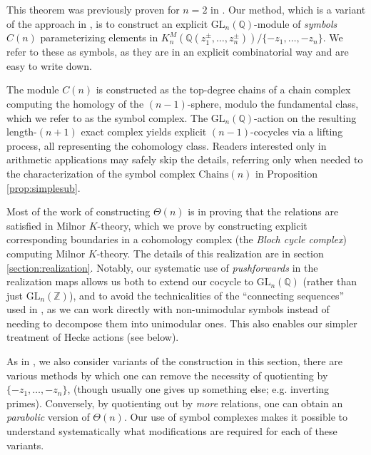 \documentclass[10pt]{amsart}
\theoremstyle{definition}
\newcommand{\Z}{\mathbb{Z}}
\newcommand{\Q}{\mathbb{Q}}
\newcommand{\Chains}{\mathrm{Chains}}
\newcommand{\GL}{\mathrm{GL}}
\numberwithin{equation}{section}
\begin{document}
    This theorem was previously proven for $n=2$ in \cite{SV}. Our method, which is a variant of the approach in \cite[\S5]{SV}, is to construct an explicit $\GL_n(\Q)$-module of \emph{symbols} $C(n)$ parameterizing elements in $K_n^M(\Q(z_1^{\pm},\ldots, z_n^{\pm}))/\{-z_1,\ldots, -z_n\}$. We refer to these as symbols, as they are in an explicit combinatorial way and are easy to write down.

    The module $C(n)$ is constructed as the top-degree chains of a chain complex computing the homology of the $(n-1)$-sphere, modulo the fundamental class, which we refer to as the symbol complex. The $\GL_n(\Q)$-action on the resulting length-$(n+1)$ exact complex yields explicit $(n-1)$-cocycles via a lifting process, all representing the cohomology class. Readers interested only in arithmetic applications may safely skip the details, referring only when needed to the characterization of the symbol complex $\Chains(n)$ in Proposition \ref{prop:simplesub}. 
    
    Most of the work of constructing $\Theta(n)$ is in proving that the relations are satisfied in Milnor $K$-theory, which we prove by constructing explicit corresponding boundaries in a cohomology complex (the \emph{Bloch cycle complex}) computing Milnor $K$-theory. The details of this realization are in section \ref{section:realization}. Notably, our systematic use of \emph{pushforwards} in the realization maps allows us both to extend our cocycle to $\GL_n(\Q)$ (rather than just $\GL_n(\Z)$), and to avoid the technicalities of the ``connecting sequences'' used in \cite{SV}, as we can work directly with non-unimodular symbols instead of needing to decompose them into unimodular ones. This also enables our simpler treatment of Hecke actions (see below).
    
    As in \cite[\S5]{SV}, we also consider variants of the construction in this section, there are various methods by which one can remove the necessity of quotienting by $\{-z_1,\ldots, -z_n\}$, (though usually one gives up something else; e.g. inverting primes). Conversely, by quotienting out by \emph{more} relations, one can obtain an \emph{parabolic} version of $\Theta(n)$. Our use of symbol complexes makes it possible to understand systematically what modifications are required for each of these variants.
\end{document}
